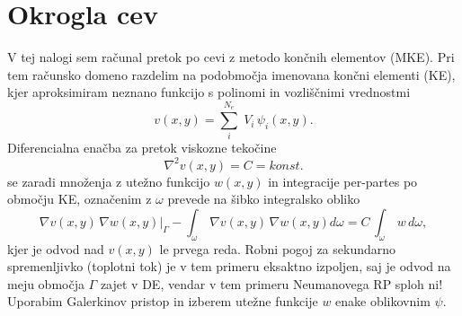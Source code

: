 \section{Okrogla cev}

V tej nalogi sem  računal pretok po cevi z metodo končnih elementov (MKE). Pri tem računsko domeno razdelim na podobmočja imenovana končni elementi (KE), kjer aproksimiram neznano funkcijo s polinomi in vozliščnimi vrednostmi 
\begin{equation}
    v(x,y) = \sum_i^{N_e}\;V_i\,\psi_i(x,y).
\end{equation}
Diferencialna enačba za pretok viskozne tekočine
\begin{equation}
    \nabla^2 v(x,y) = C = konst.
\end{equation}
se zaradi množenja z utežno funkcijo $w(x,y)$ in integracije per-partes po območju KE, označenim z $\omega$ prevede na šibko integralsko obliko
\begin{equation}
    \nabla v(x,y)\,\nabla w(x,y) \Biggr |_{\Gamma} - \int_{\omega}\,\nabla v(x,y)\, \nabla w(x,y) d\omega = C\, \int_{\omega}\,w\,d\omega,
\end{equation}
kjer je odvod nad $v(x,y)$ le prvega reda. Robni pogoj za sekundarno spremenljivko (toplotni tok) je v tem primeru eksaktno izpoljen, saj je odvod na meju območja $\Gamma$ zajet v DE, vendar v tem primeru Neumanovega RP sploh ni! Uporabim Galerkinov pristop in izberem utežne funkcije $w$ enake oblikovnim $\psi$.

